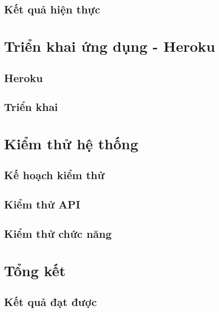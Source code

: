 \documentclass[a4paper,12pt,fleqn,print,oneside]{extarticle}
\begin{document}
\subsection{Kết quả hiện thực}


\newpage
\section{Triển khai ứng dụng - Heroku}
\subsection{Heroku}


\subsection{Triển khai}



\newpage
\section{Kiểm thử hệ thống}


\subsection{Kế hoạch kiểm thử}


\subsection{Kiểm thử API}


\subsection{Kiểm thử chức năng}



\newpage
\section{Tổng kết}
\subsection{Kết quả đạt được}

\end{document}
